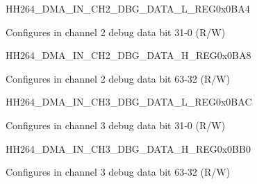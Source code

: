     
    \begin{register}{H}{H264\_DMA\_IN\_CH2\_DBG\_DATA\_L\_REG}{0x0BA4}\label{regdesc:H264DMAINCH2DBGDATALREG}
    \regnewline%
    \begin{regdesc}\begin{reglist}
    \label{fielddesc:H264INCH2DBGDATAL}\item [H264\_IN\_CH2\_DBG\_DATA\_L] Configures in channel 2 debug data bit 31-0 (R/W)
    \end{reglist}\end{regdesc}
    \end{register}
    
    
    \begin{register}{H}{H264\_DMA\_IN\_CH2\_DBG\_DATA\_H\_REG}{0x0BA8}\label{regdesc:H264DMAINCH2DBGDATAHREG}
    \regnewline%
    \begin{regdesc}\begin{reglist}
    \label{fielddesc:H264INCH2DBGDATAH}\item [H264\_IN\_CH2\_DBG\_DATA\_H] Configures in channel 2 debug data bit 63-32 (R/W)
    \end{reglist}\end{regdesc}
    \end{register}
    
    
    \begin{register}{H}{H264\_DMA\_IN\_CH3\_DBG\_DATA\_L\_REG}{0x0BAC}\label{regdesc:H264DMAINCH3DBGDATALREG}
    \regnewline%
    \begin{regdesc}\begin{reglist}
    \label{fielddesc:H264INCH3DBGDATAL}\item [H264\_IN\_CH3\_DBG\_DATA\_L] Configures in channel 3 debug data bit 31-0 (R/W)
    \end{reglist}\end{regdesc}
    \end{register}
    
    
    \begin{register}{H}{H264\_DMA\_IN\_CH3\_DBG\_DATA\_H\_REG}{0x0BB0}\label{regdesc:H264DMAINCH3DBGDATAHREG}
    \regnewline%
    \begin{regdesc}\begin{reglist}
    \label{fielddesc:H264INCH3DBGDATAH}\item [H264\_IN\_CH3\_DBG\_DATA\_H] Configures in channel 3 debug data bit 63-32 (R/W)
    \end{reglist}\end{regdesc}
    \end{register}
    
